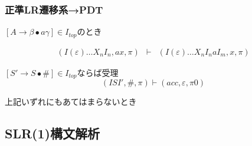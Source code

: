 \documentclass[dvipdfmx]{beamer}
\begin{document}
\begin{frame}
  \frametitle{正準LR遷移系→PDT}
  \begin{trivlist}
    \item [{\bf シフト}]
    $[A\rightarrow\beta\bullet a\gamma]\in I_{top}$のとき

    \[
      \begin{array}{lll}
        (I(\varepsilon)\ldots X_nI_n,ax,\pi) &
        \vdash
                                             & (I(\varepsilon)\ldots X_nI_naI_m,x,\pi)
      \end{array}
    \]


    \vspace*{10pt}

    \item [{\bf 受理}]
    $[S'\rightarrow S\bullet\#]\in I_{top}$ならば受理
    \[
      (ISI',\texttt{\#},\pi)\vdash(acc,\varepsilon,\pi 0)
    \]

    \vspace*{10pt}

    \item [{\bf 誤り}]
    上記いずれにもあてはまらないとき
  \end{trivlist}
\end{frame}

\subsection{SLR(1)構文解析}
\end{document}
